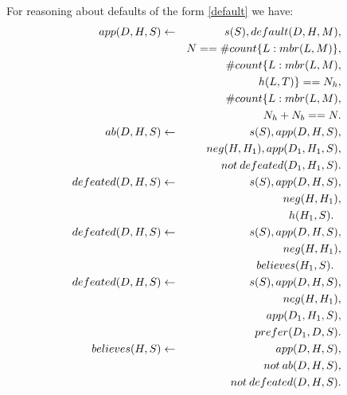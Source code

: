 \documentclass{article}
\def\naf{\: {not} \:}
\begin{document}
 For reasoning about defaults  of the form \eqref{default} we have:
% 
\begin{eqnarray}
app(D, H, S) & \leftarrow  &  s(S), default(D, H, M), \nonumber \\
        & & N  == \# count \{L : mbr(L, M)\},    \nonumber\\
        & & \# count \{L : mbr(L, M),  \nonumber\\
        & & \hspace*{.8in}h(L, T) \}== N_h,  \nonumber\\ 
        & & \# count \{L : mbr(L, M), \nonumber\\
        & & N_h+N_b==N. \label{lp:app} \\ 
ab(D, H, S)& \leftarrow &   s(S), app(D, H, S), \nonumber\\
    & &  neg(H, H_1), app(D_1, H_1, S),  \nonumber \\
    &&   \naf defeated(D_1, H_1, S).  \label{lp:ab}      \\
defeated(D, H, S) & \leftarrow  & s(S), app(D, H, S), \nonumber\\
        & &  neg(H,H_1), \nonumber \\
        & &  h(H_1, S).  \:\:\:  \label{lp:defeat01} \\ 
defeated(D, H, S) & \leftarrow  & s(S), app(D, H, S), \nonumber\\
        & &  neg(H,H_1), \nonumber \\
        & &  believes(H_1, S).  \:\:\:  \label{lp:defeat0} \\ 
defeated(D, H, S) & \leftarrow  & s(S),  app(D, H, S),    \nonumber \\ 
        & &  neg(H,H_1), \nonumber \\ %
        & & app(D_1, H_1, S), \nonumber\\
        & & prefer(D_1, D, S).   \label{lp:defeat}\\
believes(H, S) & \leftarrow & app(D, H, S), \nonumber \\
        & & \naf ab(D, H, S), \nonumber\\
        & & \naf defeated(D, H, S).  \label{lp:holds}
%    

\end{eqnarray}
\end{document}
